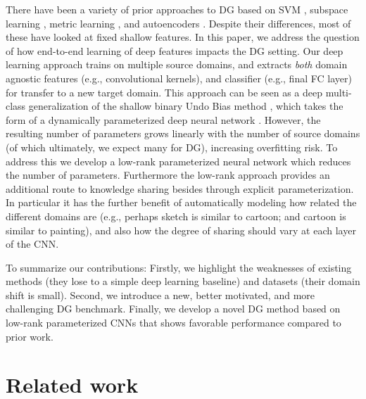 \documentclass[10pt,twocolumn,letterpaper]{article}
\begin{document}
There have been a variety of prior approaches to DG based on SVM \cite{ECCV12_Khosla,xu2014exploiting}, subspace learning \cite{muandet2013domainGen}, metric learning \cite{fang2013unbiased}, and autoencoders \cite{ghifary2015domain}. Despite their differences, most of these have looked at fixed shallow features. In this paper, we address the question of how end-to-end learning of deep features impacts the DG setting. Our deep learning approach trains on multiple source domains, and extracts \emph{both} domain agnostic features (e.g., convolutional kernels), and classifier (e.g., final FC layer) for transfer to a new target domain. This approach can be seen as a deep multi-class generalization of the shallow binary {Undo Bias} method \cite{ECCV12_Khosla}, which takes the form of a dynamically parameterized deep neural network \cite{sigaud2015gatedInventory}. However, the resulting number of parameters grows linearly with the number of source domains (of which ultimately, we expect many for DG), increasing overfitting risk. To address this we develop a low-rank parameterized neural network which reduces the number of parameters. Furthermore the low-rank approach provides an additional route to knowledge sharing besides through explicit parameterization. In particular it has the further benefit of automatically modeling how related the different domains are (e.g., perhaps sketch is similar to cartoon; and cartoon is similar to painting), and also how the degree of sharing should vary at each layer of the CNN.


To summarize our contributions: Firstly, we highlight the weaknesses of existing methods (they lose to a simple deep learning baseline) and datasets (their domain shift is small). Second, we introduce a new, better motivated, and more challenging DG benchmark. Finally, we develop a novel DG method based on low-rank parameterized CNNs that shows favorable performance compared to prior work.





\section{Related work}
\end{document}
